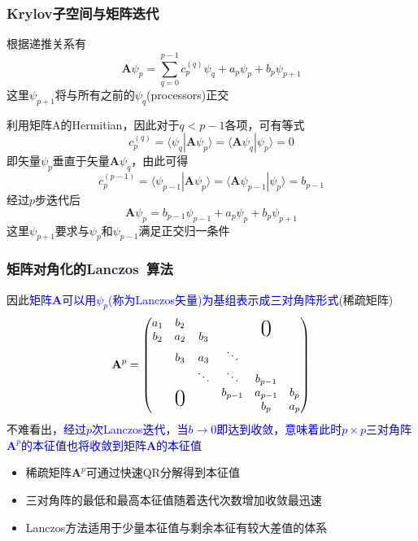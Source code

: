 \frame
{
	\frametitle{\textrm{Krylov}子空间与矩阵迭代}
	根据递推关系有
	\begin{displaymath}
		\mathbf{A}\psi_p=\sum_{q=0}^{p-1}c_p^{(q)}\psi_q+a_p\psi_p+b_p\psi_{p+1}
	\end{displaymath}
	这里$\psi_{p+1}$将与所有之前的$\psi_q$(\textrm{processors})正交

	利用矩阵$\mathrm{A}$的\textrm{Hermitian}，因此对于$q<p-1$各项，可有等式
	\begin{displaymath}
		c_p^{(q)}=\langle\psi_q|\mathbf{A}\psi_p\rangle=\langle\mathbf{A}\psi_q|\psi_p\rangle=0
	\end{displaymath}
	即矢量$\psi_p$垂直于矢量$\mathbf{A}\psi_q$，由此可得
	\begin{displaymath}
		c_p^{(p-1)}=\langle\psi_{p-1}|\mathbf{A}\psi_p\rangle=\langle\mathbf{A}\psi_{p-1}|\psi_p\rangle=b_{p-1}
	\end{displaymath}
	经过$p$步迭代后
	\begin{displaymath}
		\mathbf{A}\psi_p=b_{p-1}\psi_{p-1}+a_p\psi_p+b_p\psi_{p+1}
	\end{displaymath}
	这里$\psi_{p+1}$要求与$\psi_p$和$\psi_{p-1}$满足正交归一条件
}

\frame
{
	\frametitle{矩阵对角化的\textrm{Lanczos~}算法}
	因此\textcolor{blue}{矩阵$\mathbf{A}$可以用$\psi_p$(称为\textrm{Lanczos}矢量)为基组表示成三对角阵形式}(稀疏矩阵)
	\begin{displaymath}
		\mathbf{A}^p=\begin{pmatrix}
			a_1 & b_2 & & & & \\
			b_2 & a_2 &b_3 & &\raisebox{0.8ex}[0pt]{\huge{0}} &\\
&b_3 &a_3 &\ddots & & \\
& &\ddots &\ddots &b_{p-1} & \\
& & &b_{p-1} &a_{p-1} &b_{p}\\
&\raisebox{0.8ex}[0pt]{\huge{0}} & & &b_{p} &a_{p}
		\end{pmatrix}
	\end{displaymath}
	不难看出，\textcolor{blue}{经过$p$次\textrm{Lanczos}迭代，当$b\rightarrow0$即达到收敛，意味着此时$p\times p$三对角阵$\mathbf{A}^p$的本征值也将收敛到矩阵$\mathbf{A}$的本征值}
	\begin{itemize}
		\item 稀疏矩阵$\mathbf{A}^p$可通过快速\textrm{QR}分解得到本征值
		\item 三对角阵的最低和最高本征值随着迭代次数增加收敛最迅速
		\item \textrm{Lanczos}方法适用于少量本征值与剩余本征有较大差值的体系
	\end{itemize}
}

